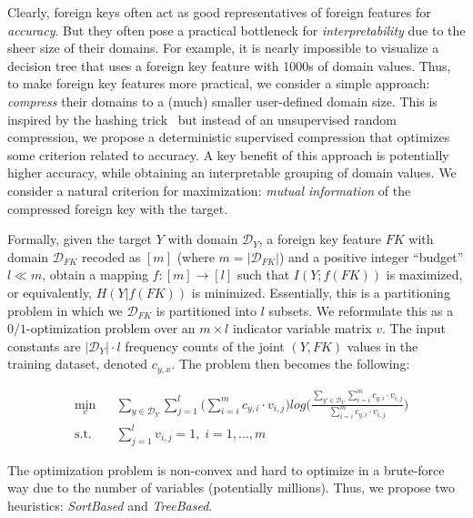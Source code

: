 \documentclass[sigconf]{acmart}
\begin{document}
Clearly, foreign keys often act as good representatives of foreign features for \textit{accuracy}.
But they often pose a practical bottleneck for \textit{interpretability} due to the sheer size of their domains.
For example, it is nearly impossible to visualize a decision tree that uses a foreign key feature with 1000s of domain values.
Thus, to make foreign key features more practical, we consider a simple approach: \textit{compress} their domains to a (much) smaller 
user-defined domain size. This is inspired by the hashing trick~\cite{hashingtrick} but instead of an unsupervised random 
compression, we propose a deterministic supervised compression that optimizes some criterion related to accuracy. A key benefit of 
this approach is potentially higher accuracy, while obtaining an interpretable grouping of domain values.
We consider a natural criterion for maximization: \textit{mutual information} of the compressed foreign key with the target.

Formally, given the target $Y$ with domain $\mathcal{D}_Y$, a foreign key feature $FK$ with domain $\mathcal{D}_{FK}$ recoded as $[m]$ 
(where $m = |\mathcal{D}_{FK}|$) and a positive integer ``budget'' $l \ll m$, obtain a mapping $f: [m] \rightarrow [l]$ such that $I(Y; f(FK))$ is maximized,
or equivalently, $H(Y|f(FK))$ is minimized. Essentially, this is a partitioning problem in which we $\mathcal{D}_{FK}$ is partitioned into $l$ subsets. 
We reformulate this as a $0/1$-optimization problem over an $m \times l$ indicator variable matrix $v$.
The input constants are $|\mathcal{D}_Y| \cdot l$ frequency counts of the joint $(Y, FK)$ values in the training dataset, denoted $c_{y, x}$.
The problem then becomes the following:

\begin{equation*}
\begin{aligned}
& \underset{v}{\text{min}}
& & \sum_{y \in \mathcal{D}_Y} \sum_{j=1}^l \bigg(\sum_{i=i}^m c_{y,i} \cdot v_{i,j} \bigg) log \bigg(\frac{\sum_{y' \in \mathcal{D}_Y} \sum_{i=i}^m c_{y,i} \cdot v_{i,j}}{\sum_{i=i}^m c_{y,i} \cdot v_{i,j}}\bigg) \\
& \text{s.t.}
& & \sum_{j=1}^l v_{i,j} = 1, \; i = 1, \ldots, m
\end{aligned}
\end{equation*}

The optimization problem is non-convex and hard to optimize in a brute-force  way due to the number of variables (potentially millions). Thus, we propose two heuristics: \textit{SortBased} and \textit{TreeBased}.
\end{document}
